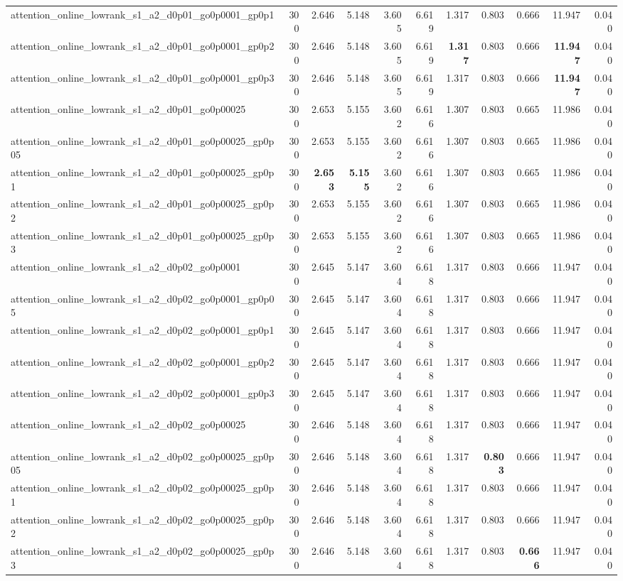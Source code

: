 \begin{table}[t]
\begin{tabular}{lrrrrrrrrrr}
attention_online_lowrank_s1_a2_d0p01_go0p0001_gp0p1 & 300 & 2.646 & 5.148 & 3.605 & 6.619 & 1.317 & 0.803 & 0.666 & 11.947 & 0.040 \\
attention_online_lowrank_s1_a2_d0p01_go0p0001_gp0p2 & 300 & 2.646 & 5.148 & 3.605 & 6.619 & \textbf{1.317} & 0.803 & 0.666 & \textbf{11.947} & 0.040 \\
attention_online_lowrank_s1_a2_d0p01_go0p0001_gp0p3 & 300 & 2.646 & 5.148 & 3.605 & 6.619 & 1.317 & 0.803 & 0.666 & \textbf{11.947} & 0.040 \\
attention_online_lowrank_s1_a2_d0p01_go0p00025 & 300 & 2.653 & 5.155 & 3.602 & 6.616 & 1.307 & 0.803 & 0.665 & 11.986 & 0.040 \\
attention_online_lowrank_s1_a2_d0p01_go0p00025_gp0p05 & 300 & 2.653 & 5.155 & 3.602 & 6.616 & 1.307 & 0.803 & 0.665 & 11.986 & 0.040 \\
attention_online_lowrank_s1_a2_d0p01_go0p00025_gp0p1 & 300 & \textbf{2.653} & \textbf{5.155} & 3.602 & 6.616 & 1.307 & 0.803 & 0.665 & 11.986 & 0.040 \\
attention_online_lowrank_s1_a2_d0p01_go0p00025_gp0p2 & 300 & 2.653 & 5.155 & 3.602 & 6.616 & 1.307 & 0.803 & 0.665 & 11.986 & 0.040 \\
attention_online_lowrank_s1_a2_d0p01_go0p00025_gp0p3 & 300 & 2.653 & 5.155 & 3.602 & 6.616 & 1.307 & 0.803 & 0.665 & 11.986 & 0.040 \\
attention_online_lowrank_s1_a2_d0p02_go0p0001 & 300 & 2.645 & 5.147 & 3.604 & 6.618 & 1.317 & 0.803 & 0.666 & 11.947 & 0.040 \\
attention_online_lowrank_s1_a2_d0p02_go0p0001_gp0p05 & 300 & 2.645 & 5.147 & 3.604 & 6.618 & 1.317 & 0.803 & 0.666 & 11.947 & 0.040 \\
attention_online_lowrank_s1_a2_d0p02_go0p0001_gp0p1 & 300 & 2.645 & 5.147 & 3.604 & 6.618 & 1.317 & 0.803 & 0.666 & 11.947 & 0.040 \\
attention_online_lowrank_s1_a2_d0p02_go0p0001_gp0p2 & 300 & 2.645 & 5.147 & 3.604 & 6.618 & 1.317 & 0.803 & 0.666 & 11.947 & 0.040 \\
attention_online_lowrank_s1_a2_d0p02_go0p0001_gp0p3 & 300 & 2.645 & 5.147 & 3.604 & 6.618 & 1.317 & 0.803 & 0.666 & 11.947 & 0.040 \\
attention_online_lowrank_s1_a2_d0p02_go0p00025 & 300 & 2.646 & 5.148 & 3.604 & 6.618 & 1.317 & 0.803 & 0.666 & 11.947 & 0.040 \\
attention_online_lowrank_s1_a2_d0p02_go0p00025_gp0p05 & 300 & 2.646 & 5.148 & 3.604 & 6.618 & 1.317 & \textbf{0.803} & 0.666 & 11.947 & 0.040 \\
attention_online_lowrank_s1_a2_d0p02_go0p00025_gp0p1 & 300 & 2.646 & 5.148 & 3.604 & 6.618 & 1.317 & 0.803 & 0.666 & 11.947 & 0.040 \\
attention_online_lowrank_s1_a2_d0p02_go0p00025_gp0p2 & 300 & 2.646 & 5.148 & 3.604 & 6.618 & 1.317 & 0.803 & 0.666 & 11.947 & 0.040 \\
attention_online_lowrank_s1_a2_d0p02_go0p00025_gp0p3 & 300 & 2.646 & 5.148 & 3.604 & 6.618 & 1.317 & 0.803 & \textbf{0.666} & 11.947 & 0.040 \\
\bottomrule
\end{tabular}
\end{table}